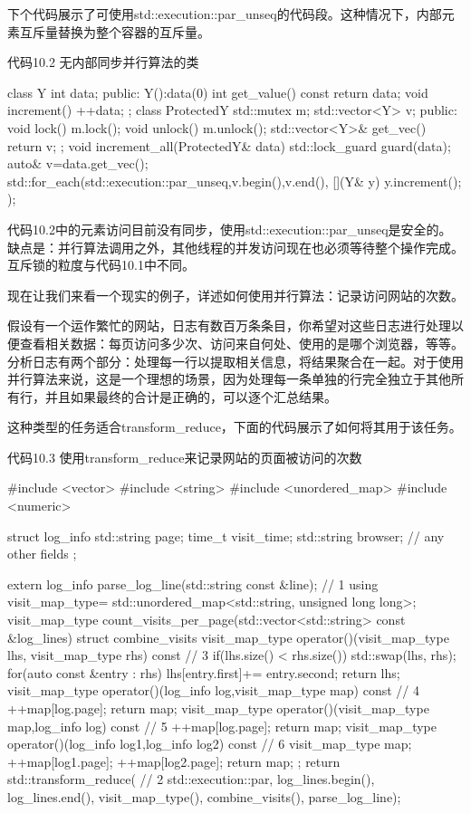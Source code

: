 下个代码展示了可使用std::execution::par\_unseq的代码段。这种情况下，内部元素互斥量替换为整个容器的互斥量。

代码10.2 无内部同步并行算法的类

\begin{cpp}
class Y{
  int data;
public:
  Y():data(0){}
  int get_value() const{
    return data;
  }
  void increment(){
    ++data;
  }
};
class ProtectedY{
  std::mutex m;
  std::vector<Y> v;
public:
  void lock(){
    m.lock();
  }
  void unlock(){
    m.unlock();
  }
  std::vector<Y>& get_vec(){
    return v;
  }
};
void increment_all(ProtectedY& data){
  std::lock_guard guard(data);
  auto& v=data.get_vec();
  std::for_each(std::execution::par_unseq,v.begin(),v.end(),
    [](Y& y){
      y.increment();
    });
}
\end{cpp}

代码10.2中的元素访问目前没有同步，使用std::execution::par\_unseq是安全的。缺点是：并行算法调用之外，其他线程的并发访问现在也必须等待整个操作完成。互斥锁的粒度与代码10.1中不同。

现在让我们来看一个现实的例子，详述如何使用并行算法：记录访问网站的次数。


假设有一个运作繁忙的网站，日志有数百万条条目，你希望对这些日志进行处理以便查看相关数据：每页访问多少次、访问来自何处、使用的是哪个浏览器，等等。分析日志有两个部分：处理每一行以提取相关信息，将结果聚合在一起。对于使用并行算法来说，这是一个理想的场景，因为处理每一条单独的行完全独立于其他所有行，并且如果最终的合计是正确的，可以逐个汇总结果。

这种类型的任务适合transform\_reduce，下面的代码展示了如何将其用于该任务。

代码10.3 使用transform\_reduce来记录网站的页面被访问的次数

\begin{cpp}
#include <vector>
#include <string>
#include <unordered_map>
#include <numeric>

struct log_info {
  std::string page;
  time_t visit_time;
  std::string browser;
  // any other fields
};

extern log_info parse_log_line(std::string const &line); // 1
using visit_map_type= std::unordered_map<std::string, unsigned long long>;
visit_map_type
count_visits_per_page(std::vector<std::string> const &log_lines) {
  struct combine_visits {
    visit_map_type
    operator()(visit_map_type lhs, visit_map_type rhs) const { // 3
      if(lhs.size() < rhs.size())
        std::swap(lhs, rhs);
      for(auto const &entry : rhs) {
        lhs[entry.first]+= entry.second;
      }
      return lhs;
    }
    visit_map_type operator()(log_info log,visit_map_type map) const{ // 4
      ++map[log.page];
      return map;
    }
    visit_map_type operator()(visit_map_type map,log_info log) const{ // 5
      ++map[log.page];
      return map;
    }
    visit_map_type operator()(log_info log1,log_info log2) const{ // 6
      visit_map_type map;
      ++map[log1.page];
      ++map[log2.page];
      return map;
    }
  };
  return std::transform_reduce( // 2
    std::execution::par, log_lines.begin(), log_lines.end(),
    visit_map_type(), combine_visits(), parse_log_line);
}
\end{cpp}

